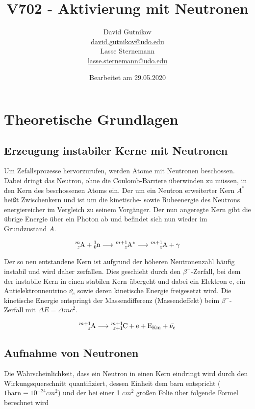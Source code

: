 \documentclass[titlepage = firstcover]{scrartcl}
\title{V702 - Aktivierung mit Neutronen}
\author{
  David Gutnikov\\
  \href{mailto:david.gutnikov@udo.edu}{david.gutnikov@udo.edu}\\
  Lasse Sternemann\\
  \href{mailto:lasse.sternemann@udo.edu}{lasse.sternemann@udo.edu}
}
\date{Bearbeitet am 29.05.2020}
\begin{document}
    \maketitle
    \newpage
    \tableofcontents
    \newpage


    \section{Theoretische Grundlagen}
        \subsection{Erzeugung instabiler Kerne mit Neutronen}
            Um Zefallsprozesse hervorzurufen, werden Atome mit Neutronen beschossen. Dabei dringt das Neutron, ohne die Coulomb-Barriere überwinden zu müssen, in den Kern des beschossenen Atoms ein. 
            Der um ein Neutron erweiterter Kern $A^*$ heißt Zwischenkern und ist um die kinetische- sowie Ruheenergie des Neutrons energiereicher im Vergleich zu seinem Vorgänger. Der nun angeregte Kern
            gibt die übrige Energie über ein Photon ab und befindet sich nun wieder im Grundzustand $A$.
            
            \begin{equation*}
                \ce{^{m}_{z}A} + \ce{^{1}_{0}n} \longrightarrow \ce{^{m+1}_{z}A}^* \longrightarrow \ce{^{m+1}_{z}A} + \gamma
            \end{equation*}

            \noindent
            Der so neu entstandene Kern ist aufgrund der höheren Neutronenzahl häufig instabil und wird daher zerfallen. Dies geschieht durch den $\beta^-$-Zerfall, bei dem der instabile Kern in einen
            stabilen Kern übergeht und dabei ein Elektron e, ein Antielektronneutrino $\bar{\nu_e}$ sowie deren kinetische Energie freigesetzt wird. Die kinetische Energie entspringt der Massendifferenz
            (Massendeffekt) beim $\beta^-$-Zerfall mit $\Delta E = \Delta mc^2$.

            \begin{equation*}
                \ce{^{m+1}_{z}A} \longrightarrow \ce{^{m+1}_{z+1}C} + \text{e} + \text{E}_{\text{Kin}} + \bar{\nu_e}
            \end{equation*}

        \subsection{Aufnahme von Neutronen}
            Die Wahrscheinlichkeit, dass ein Neutron in einen Kern eindringt wird durch den Wirkungsquerschnitt quantifiziert, dessen Einheit dem barn entspricht ($1 \text{barn} \equiv 10^{-24} cm^2$)
            und der bei einer 1 $cm^2$ großen Folie über folgende Formel berechnet wird
            
\end{document}
